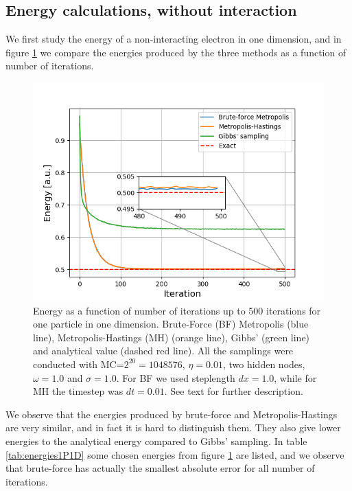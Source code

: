 \documentclass[norsk,a4paper,12pt]{article}
\begin{document}
\subsection{Energy calculations, without interaction}
We first study the energy of a non-interacting electron in one dimension, and in figure \ref{fig:energy1P1D} we compare the energies produced by the three methods as a function of number of iterations. 
 \begin{figure} [H]
 	\centering
 	\includegraphics[scale=0.8]{plots/energy_comparison.png}
 	\caption{Energy as a function of number of iterations up to 500 iterations for one particle in one dimension. Brute-Force (BF) Metropolis (blue line), Metropolis-Hastings (MH) (orange line), Gibbs' (green line) and analytical value (dashed red line). All the samplings were conducted with MC=$2^{20}=1048576$, $\eta=0.01$, two hidden nodes, $\omega=1.0$ and $\sigma=1.0$. For BF we used steplength $dx=1.0$, while for MH the timestep was $dt=0.01$. See text for further description.}
 	\label{fig:energy1P1D}
 \end{figure}
We observe that the energies produced by brute-force and Metropolis-Hastings are very similar, and in fact it is hard to distinguish them. They also give lower energies to the analytical energy compared to Gibbs' sampling. In table \ref{tab:energies1P1D} some chosen energies from figure \ref{fig:energy1P1D} are listed, and we observe that brute-force has actually the smallest absolute error for all number of iterations. 
\end{document}
